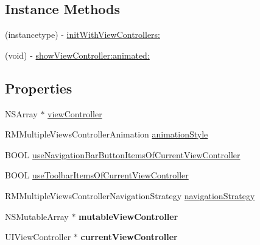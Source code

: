 \subsection*{Instance Methods}
\begin{DoxyCompactItemize}
\item 
(instancetype) -\/ \mbox{\hyperlink{interface_r_m_multiple_views_controller_a57a5d47945554e5375117d96c72a5ca8}{init\+With\+View\+Controllers\+:}}
\item 
(void) -\/ \mbox{\hyperlink{interface_r_m_multiple_views_controller_a29d7315c4bd1c8bf1c7cc249bc5a4ae6}{show\+View\+Controller\+:animated\+:}}
\end{DoxyCompactItemize}
\subsection*{Properties}
\begin{DoxyCompactItemize}
\item 
N\+S\+Array $\ast$ \mbox{\hyperlink{interface_r_m_multiple_views_controller_af2450dcbf3350a9b4657731ded6f1caf}{view\+Controller}}
\item 
R\+M\+Multiple\+Views\+Controller\+Animation \mbox{\hyperlink{interface_r_m_multiple_views_controller_ab96e09cddb43777788b9edebbfb06839}{animation\+Style}}
\item 
B\+O\+OL \mbox{\hyperlink{interface_r_m_multiple_views_controller_ade7d30161846030d33fc0fa5ab09b5c9}{use\+Navigation\+Bar\+Button\+Items\+Of\+Current\+View\+Controller}}
\item 
B\+O\+OL \mbox{\hyperlink{interface_r_m_multiple_views_controller_a11a162f4a0efb651a0c1566c44738eb9}{use\+Toolbar\+Items\+Of\+Current\+View\+Controller}}
\item 
R\+M\+Multiple\+Views\+Controller\+Navigation\+Strategy \mbox{\hyperlink{interface_r_m_multiple_views_controller_a2c5bd2500e378457eefd5530187e39a8}{navigation\+Strategy}}
\item 
\mbox{\label{interface_r_m_multiple_views_controller_afaf90f607288a1ae335e64ee8f673c91}} 
N\+S\+Mutable\+Array $\ast$ {\bfseries mutable\+View\+Controller}
\item 
\mbox{\label{interface_r_m_multiple_views_controller_a8d9d8181a7abea9f83effee6194531fc}} 
U\+I\+View\+Controller $\ast$ {\bfseries current\+View\+Controller}
\end{DoxyCompactItemize}


